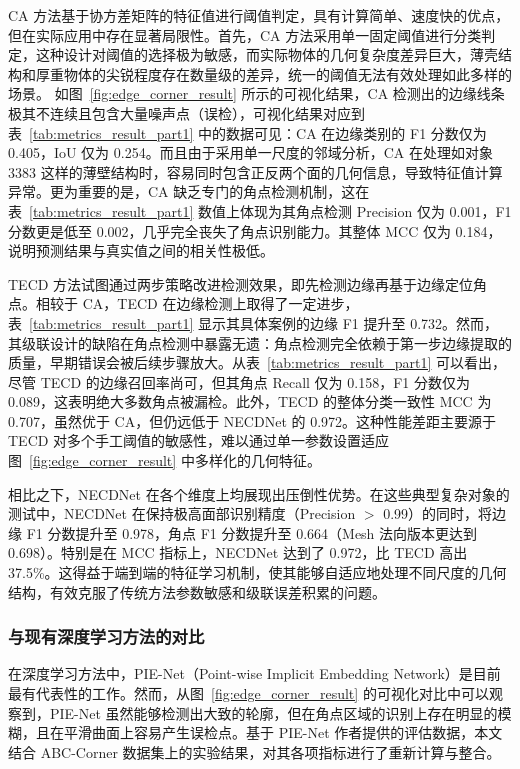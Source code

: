 CA 方法基于协方差矩阵的特征值进行阈值判定，具有计算简单、速度快的优点，但在实际应用中存在显著局限性。首先，CA 方法采用单一固定阈值进行分类判定，这种设计对阈值的选择极为敏感，而实际物体的几何复杂度差异巨大，薄壳结构和厚重物体的尖锐程度存在数量级的差异，统一的阈值无法有效处理如此多样的场景。
如图~\ref{fig:edge_corner_result} 所示的可视化结果，CA 检测出的边缘线条极其不连续且包含大量噪声点（误检），可视化结果对应到表~\ref{tab:metrics_result_part1} 中的数据可见：CA 在边缘类别的 F1 分数仅为 0.405，IoU 仅为 0.254。而且由于采用单一尺度的邻域分析，CA 在处理如对象 3383 这样的薄壁结构时，容易同时包含正反两个面的几何信息，导致特征值计算异常。更为重要的是，CA 缺乏专门的角点检测机制，这在表~\ref{tab:metrics_result_part1} 数值上体现为其角点检测 Precision 仅为 0.001，F1 分数更是低至 0.002，几乎完全丧失了角点识别能力。其整体 MCC 仅为 0.184，说明预测结果与真实值之间的相关性极低。

TECD 方法试图通过两步策略改进检测效果，即先检测边缘再基于边缘定位角点。相较于 CA，TECD 在边缘检测上取得了一定进步，表~\ref{tab:metrics_result_part1} 显示其具体案例的边缘 F1 提升至 0.732。然而，其级联设计的缺陷在角点检测中暴露无遗：角点检测完全依赖于第一步边缘提取的质量，早期错误会被后续步骤放大。从表~\ref{tab:metrics_result_part1} 可以看出，尽管 TECD 的边缘召回率尚可，但其角点 Recall 仅为 0.158，F1 分数仅为 0.089，这表明绝大多数角点被漏检。此外，TECD 的整体分类一致性 MCC 为 0.707，虽然优于 CA，但仍远低于 NECDNet 的 0.972。这种性能差距主要源于 TECD 对多个手工阈值的敏感性，难以通过单一参数设置适应图~\ref{fig:edge_corner_result} 中多样化的几何特征。

相比之下，NECDNet 在各个维度上均展现出压倒性优势。在这些典型复杂对象的测试中，NECDNet 在保持极高面部识别精度（Precision $>$ 0.99）的同时，将边缘 F1 分数提升至 0.978，角点 F1 分数提升至 0.664（Mesh 法向版本更达到 0.698）。特别是在 MCC 指标上，NECDNet 达到了 0.972，比 TECD 高出 37.5\%。这得益于端到端的特征学习机制，使其能够自适应地处理不同尺度的几何结构，有效克服了传统方法参数敏感和级联误差积累的问题。

\subsubsection{与现有深度学习方法的对比}

在深度学习方法中，PIE-Net（Point-wise Implicit Embedding Network）是目前最有代表性的工作。然而，从图~\ref{fig:edge_corner_result} 的可视化对比中可以观察到，PIE-Net 虽然能够检测出大致的轮廓，但在角点区域的识别上存在明显的模糊，且在平滑曲面上容易产生误检点。基于 PIE-Net 作者提供的评估数据，本文结合 ABC-Corner 数据集上的实验结果，对其各项指标进行了重新计算与整合。

